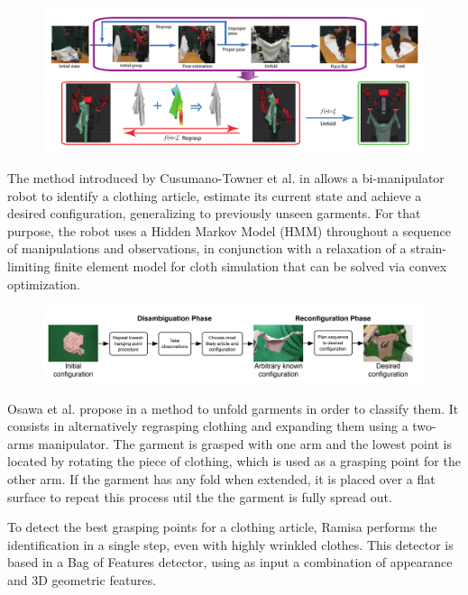 \begin{figure}[thpb]
    \centering
    \includegraphics[width=\textwidth]{figures/SOTA_Li_2015.png}
    \caption{}
    \label{fig:SOTA_Li_2015}
\end{figure}

The method introduced by Cusumano-Towner et al. in \cite{Cusumano-Towner2011} allows a bi-manipulator robot to identify a clothing article, estimate its current state and achieve a desired configuration, generalizing to previously unseen garments. For that purpose, the robot uses a Hidden Markov Model (HMM) throughout a sequence of manipulations and observations, in conjunction with a relaxation of a strain-limiting finite element model for cloth simulation that can be solved via convex optimization.

\begin{figure}[thpb]
    \centering
    \includegraphics[width=\textwidth]{figures/SOTA_Cusumano_2011.png}
    \caption{}
    \label{fig:SOTA_Cusumano_2011}
\end{figure}

Osawa et al. propose in \cite{Osawa2006} a method to unfold garments in order to classify them. It consists in alternatively regrasping clothing and expanding them using a two-arms manipulator. The garment is grasped with one arm and the lowest point is located by rotating the piece of clothing, which is used as a grasping point for the other arm. If the garment has any fold when extended, it is placed over a flat surface to repeat this process util the the garment is fully spread out.

To detect the best grasping points for a clothing article, Ramisa \cite{Ramisa2012} performs the identification in a single step, even with highly wrinkled clothes. This detector is based in a Bag of Features detector, using as input a combination of appearance and 3D geometric features.

